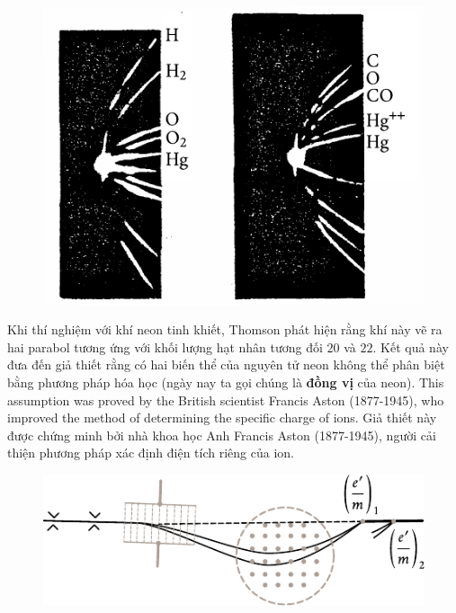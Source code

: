 \begin{figure}[t]
	\begin{center}
		\includegraphics[scale=0.9]{figures/ch_10/fig_10_10.pdf}
		\caption[]{}
		\label{fig:10_10}
	\end{center}
	\vspace{-0.8cm}
\end{figure}

Khi thí nghiệm với khí neon tinh khiết, Thomson phát hiện rằng khí này vẽ ra hai parabol tương ứng với khối lượng hạt nhân tương đối $20$ và $22$.
Kết quả này đưa đến giả thiết rằng có hai biến thể của nguyên tử neon không thể phân biệt bằng phương pháp hóa học (ngày nay ta gọi chúng là \textbf{đồng vị} của neon).
This assumption was proved by the British scientist Francis Aston (1877-1945), who improved the method of determining the specific charge of ions.
Giả thiết này được chứng minh bởi nhà khoa học Anh Francis Aston (1877-1945), người cải thiện phương pháp xác định điện tích riêng của ion.
\begin{figure}[t]
	\begin{center}
		\includegraphics[scale=1]{figures/ch_10/fig_10_11.pdf}
		\caption[]{}
		\label{fig:10_11}
	\end{center}
	\vspace{-0.75cm}
\end{figure}

